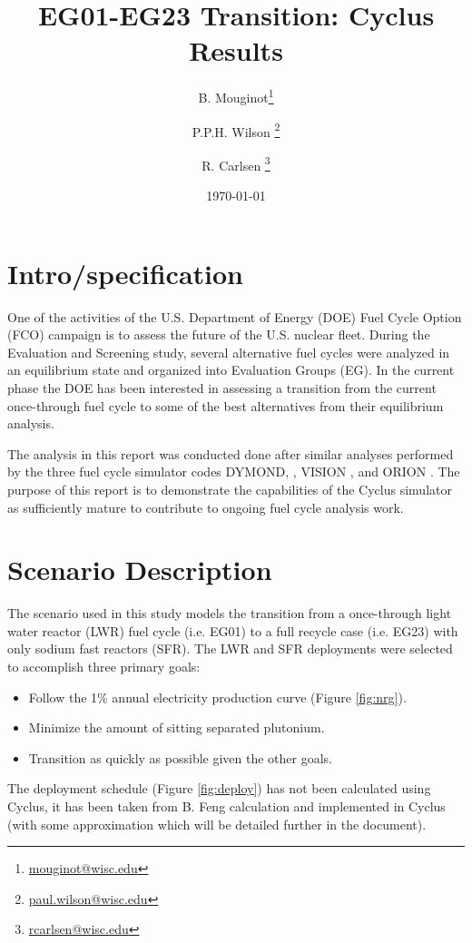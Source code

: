 \documentclass[12pt]{article}
\title{EG01-EG23 Transition: Cyclus Results}
\author[1]{B. Mouginot\thanks{\href{mailto:mouginot@wisc.edu}{mouginot@wisc.edu}}}
\author[1]{P.P.H. Wilson \thanks{\href{mailto:paul.wilson@wisc.edu}{paul.wilson@wisc.edu}}}
\author[1]{R. Carlsen \thanks{\href{mailto:rcarlsen@wisc.edu}{rcarlsen@wisc.edu}}}
\affil[1]{University of Wisconsin--Madison, Department of Engineering Physics, CNERG group}
\date{\today}
\begin{document}
\maketitle

\section{Intro/specification}

One of the activities of the U.S. Department of Energy (DOE) Fuel Cycle Option (FCO) campaign is
to assess the future of the U.S. nuclear fleet. During the Evaluation and Screening study, 
several alternative fuel cycles were analyzed in an equilibrium state and organized into Evaluation
Groups (EG).  In the current phase the DOE has been interested in assessing a transition from the
current once-through fuel cycle to some of the best alternatives from their
equilibrium analysis.

The analysis in this report was conducted done after similar analyses performed by the
three fuel cycle simulator codes DYMOND, \cite{dymon}, VISION \cite{vision},
and ORION \cite{orion}. The purpose of this report is to demonstrate the
capabilities of the Cyclus simulator \cite{cyclus} as sufficiently mature to
contribute to ongoing fuel cycle analysis work.

\section{Scenario Description}

The scenario used in this study models the transition from a once-through
light water reactor (LWR) fuel cycle (i.e. EG01) to a 
full recycle case (i.e. EG23) with only sodium fast reactors
(SFR).  The LWR and SFR deployments were
selected to accomplish three primary goals:

\begin{itemize}
    \item Follow the 1\% annual electricity production curve (Figure \ref{fig:nrg}).
    \item Minimize the amount of sitting separated plutonium.
    \item Transition as quickly as possible given the other goals.
\end{itemize}

The deployment schedule (Figure \ref{fig:deploy}) has not been calculated
using Cyclus, it has been taken from B. Feng calculation and implemented in
Cyclus (with some approximation which will be detailed further in the
document).
\end{document}
